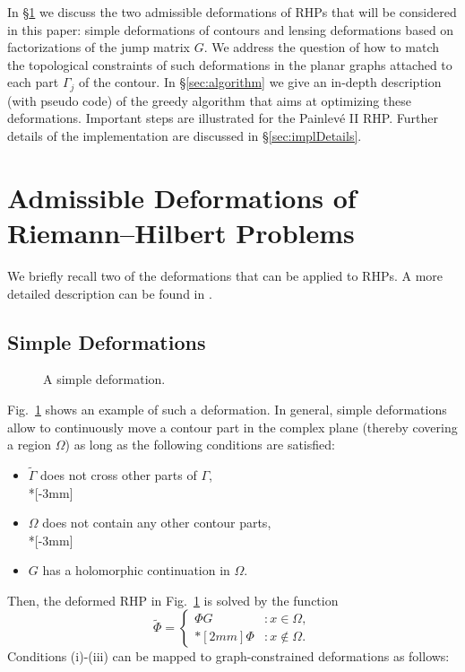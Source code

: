 \documentclass[reqno]{amsart}
\begin{document}
In §\ref{sec:deform} we discuss the two admissible deformations of RHPs that will be considered in this paper:
simple deformations of contours and lensing deformations based on factorizations of the jump matrix $G$.
We address the question of how to match the topological constraints of such deformations in the planar graphs
attached to each part $\Gamma_j$ of the contour.
In §\ref{sec:algorithm} we give an in-depth description (with pseudo code) of the greedy algorithm that 
aims at optimizing these deformations. Important steps are illustrated for the Painlevé II RHP.
Further details of the implementation are discussed in §\ref{sec:implDetails}. 
 
 
\section{Admissible Deformations of Riemann--Hilbert Problems}\label{sec:deform}
We briefly recall two of the deformations that can be applied to RHPs. A more detailed description can be found in \cite{fokas:2006:ptr}.

\subsection{Simple Deformations}
\begin{figure}[ht]
	
	\caption{A simple deformation.}
	\label{fig:steepestdescent}
\end{figure}

Fig.~\ref{fig:steepestdescent} shows an example of such a deformation. In general, simple deformations allow to continuously move a contour part in the complex plane (thereby covering a region $\Omega$) as long as the following conditions are satisfied:

\begin{itemize}
	\item[(i)] $\tilde\Gamma$ does not cross other parts of $\Gamma$,\\*[-3mm]
	\item[(ii)] $\Omega$ does not contain any other contour parts,\\*[-3mm]
	\item[(iii)] $G$ has a holomorphic continuation in $\Omega$.
\end{itemize}

\noindent
Then, the deformed RHP in Fig.~\ref{fig:steepestdescent} is solved by the function
\[
   \tilde\Phi = \left\{
     \begin{array}{lr}
       \Phi G & : x \in \Omega,\\*[2mm]
       \Phi & : x \notin \Omega.
     \end{array}
   \right.
\]
Conditions (i)-(iii) can be mapped to graph-constrained deformations as follows:
\end{document}
